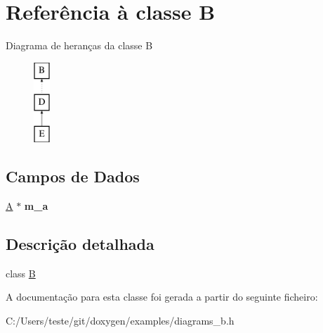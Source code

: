 \hypertarget{class_b}{\section{Referência à classe B}
\label{class_b}
}
Diagrama de heranças da classe B\begin{figure}[H]
\begin{center}
\leavevmode
\includegraphics[height=3.000000cm]{class_b}
\end{center}
\end{figure}
\subsection*{Campos de Dados}
\begin{DoxyCompactItemize}
\item 
\hypertarget{class_b_addc7d54200781ba60c58a63744812259}{\hyperlink{class_a}{A} $\ast$ {\bfseries m\-\_\-a}}\label{class_b_addc7d54200781ba60c58a63744812259}

\end{DoxyCompactItemize}


\subsection{Descrição detalhada}
class \hyperlink{class_b}{B} 

A documentação para esta classe foi gerada a partir do seguinte ficheiro\-:\begin{DoxyCompactItemize}
\item 
C\-:/\-Users/teste/git/doxygen/examples/diagrams\-\_\-b.\-h\end{DoxyCompactItemize}
